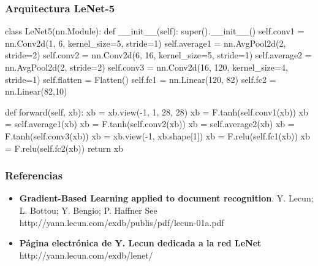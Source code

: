 \documentclass[xcolor=dvipsnames, compress]{beamer}
\begin{document}
\begin{frame}
\frametitle{Arquitectura LeNet-5}

class LeNet5(nn.Module):
    def __init__(self):
        super().__init__()
        self.conv1 = nn.Conv2d(1, 6, kernel_size=5, stride=1)
        self.average1 = nn.AvgPool2d(2, stride=2)
        self.conv2 = nn.Conv2d(6, 16, kernel_size=5, stride=1)
        self.average2 = nn.AvgPool2d(2, stride=2)
        self.conv3 = nn.Conv2d(16, 120, kernel_size=4, stride=1)   
        self.flatten = Flatten() 
        self.fc1 = nn.Linear(120, 82)
        self.fc2 = nn.Linear(82,10)
	
    def forward(self, xb):
        xb = xb.view(-1, 1, 28, 28)
        xb = F.tanh(self.conv1(xb))
        xb = self.average1(xb)
        xb = F.tanh(self.conv2(xb))
        xb = self.average2(xb)
        xb = F.tanh(self.conv3(xb))
        xb = xb.view(-1, xb.shape[1])
        xb = F.relu(self.fc1(xb))
        xb = F.relu(self.fc2(xb))
        return xb

\end{frame}

\begin{frame}
\frametitle{Referencias}

\begin{itemize}
	\item \textbf{Gradient-Based Learning applied to document recognition}.  Y. Lecun; L. Bottou; Y. Bengio; P. Haffner See http://yann.lecun.com/exdb/publis/pdf/lecun-01a.pdf
	
	\item \textbf{Página electrónica de Y. Lecun dedicada a la red LeNet} http://yann.lecun.com/exdb/lenet/
\end{itemize}

\end{frame}


%
 
\end{document}
